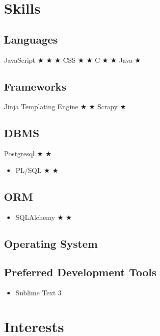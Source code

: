 \documentclass{ss_resume}
\begin{document}
\section{Skills}

\subsection{Languages}
 {JavaScript  $\bigstar$   $\bigstar$   $\bigstar$ }
 {CSS  $\bigstar$  $\bigstar$ }
 {C  $\bigstar$ $\bigstar$ }
 {Java  $\bigstar$ }

\subsection{Frameworks}
 {Jinja Templating Engine  $\bigstar$  $\bigstar$ }
 {Scrapy  $\bigstar$ }

\subsection{DBMS}
 {Postgresql  $\bigstar$  $\bigstar$  }
\begin{itemize}
    \item {PL/SQL $\bigstar$  $\bigstar$  }
\end{itemize}

\subsection{ORM}
\begin{itemize}
    \item {SQLAlchemy $\bigstar$  $\bigstar$  }
\end{itemize}

\subsection{Operating System}

\subsection{Preferred Development Tools}
\begin{itemize}
    \item Sublime Text 3
\end{itemize}

\medskip


\section{Interests}
\end{document}
